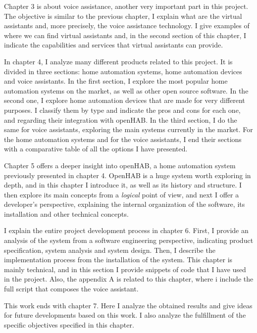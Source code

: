 Chapter 3 is about voice assistance, another very important part in this project. The objective is similar to the previous 
chapter, I explain what are the virtual assistants and, more precisely, the voice assistance technology. I give examples of where
we can find virtual assistants and, in the second section of this chapter, I indicate the capabilities and services that virtual 
assistants can provide.

In chapter 4, I analyze many different products related to this project. It is divided in three sections: home automation 
systems, home automation devices and voice assistants. In the first section, I explore the most popular home automation systems
on the market, as well as other open source software. In the second one, I explore home automation devices that are made for very
different purposes. I classify them by type and indicate the pros and cons for each one, and regarding their integration with openHAB.
In the third section, I do the same for voice assistants, exploring the main systems currently in the market. For the home automation 
systems and for the voice assistants, I end their sections with a comparative table of all the options I have presented.

Chapter 5 offers a deeper insight into openHAB, a home automation system previously presented in chapter 4. OpenHAB is a 
huge system worth exploring in depth, and in this chapter I introduce it, as well as its history and structure. I then explore its 
main concepts from a \textit{logical} point of view, and next I offer a developer's perspective, explaining the internal organization 
of the software, its installation and other technical concepts.

I explain the entire project development process in chapter 6. First, I provide an analysis of the system from a software
engineering perspective, indicating product specification, system analysis and system design. Then, I describe the implementation
process from the installation of the system. This chapter is mainly technical, and in this section I provide snippets of code that
I have used in the project. Also, the  appendix A is related to this chapter, where i include the full script that composes 
the voice assistant.

This work ends with chapter 7. Here I analyze the obtained results and give ideas for future developments based on this
work. I also analyze the fulfillment of the specific objectives specified in this chapter.


